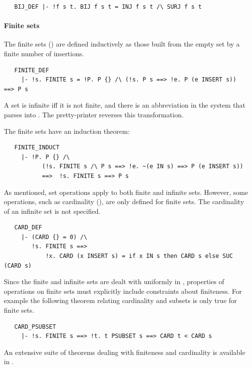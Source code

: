 {\begin{hol}
\begin{verbatim}
   BIJ_DEF |- !f s t. BIJ f s t = INJ f s t /\ SURJ f s t
\end{verbatim}
\end{hol}

\paragraph{Finite sets}
The finite sets () are defined inductively as those
built from the empty set by a finite number of insertions.
%
\begin{hol}
\begin{verbatim}
   FINITE_DEF
     |- !s. FINITE s = !P. P {} /\ (!s. P s ==> !e. P (e INSERT s)) ==> P s
\end{verbatim}
\end{hol}
%
\noindent
A set is infinite iff it is not finite, and there is an abbreviation in the system that parses  into  .
The pretty-printer reverses this transformation.

\medskip\noindent
The finite sets have an induction theorem:
%
%
\begin{hol}
\begin{verbatim}
   FINITE_INDUCT
     |- !P. P {} /\
           (!s. FINITE s /\ P s ==> !e. ~(e IN s) ==> P (e INSERT s))
           ==>  !s. FINITE s ==> P s
\end{verbatim}
\end{hol}
%
As mentioned, set operations apply to both finite and infinite
sets. However, some operations, such as cardinality
(), are only defined for finite sets.  The
cardinality of an infinite set is not specified.
%
\begin{hol}
\begin{verbatim}
   CARD_DEF
     |- (CARD {} = 0) /\
        !s. FINITE s ==>
            !x. CARD (x INSERT s) = if x IN s then CARD s else SUC (CARD s)
\end{verbatim}
\end{hol}
%
Since the finite and infinite sets are dealt with uniformly in
, properties of operations on finite sets must
explicitly include constraints about finiteness. For example the
following theorem relating cardinality and subsets is only true for
finite sets.
%
\begin{hol}
\begin{verbatim}
   CARD_PSUBSET
     |- !s. FINITE s ==> !t. t PSUBSET s ==> CARD t < CARD s
\end{verbatim}
\end{hol}
%
An extensive suite of theorems dealing with finiteness and cardinality
is available in .

}
